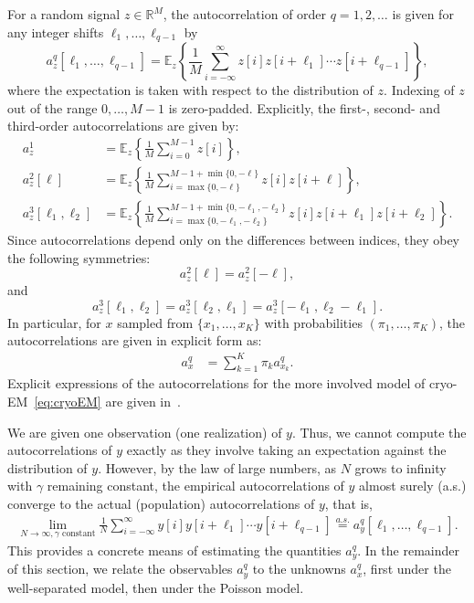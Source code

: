 \documentclass[12pt]{article}
\newcommand{\E}{\mathbb{E}}
\newcommand{\1}{\mathbf{1}}
\newcommand{\TODO}[1]{{\color{red}{[#1]}}}
\newcommand{\R}{\mathbb{R}}
\newcommand{\aseq}{\stackrel{a.s.}{=}}
\theoremstyle{plain}
\theoremstyle{definition}
\theoremstyle{remark}
\theoremstyle{plain}
\theoremstyle{remark}
\theoremstyle{plain}
\theoremstyle{plain}
\theoremstyle{plain}
\numberwithin{equation}{section}
\begin{document}
For a random signal $z\in \R^M$, the autocorrelation of order $q = 1, 2, \ldots$ is given for any integer shifts $\ell_1, \ldots, \ell_{q-1}$ by
\begin{equation}
a_z^q[\ell_1,\ldots,\ell_{q-1}]   = \E_z\left\{\frac{1}{M} \sum_{i=-\infty}^{\infty} z[i]z[i+\ell_1]\cdots z[i+\ell_{q-1}]\right\},
\label{eq:ac_general}
\end{equation}
where the expectation is taken with respect to the distribution of $z$. Indexing of $z$ out of the range $0, \ldots, M-1$ is zero-padded.
Explicitly, the first-, second- and third-order autocorrelations are given by: 
\begin{align}  
a_z^1 & = \E_z\left\{\frac{1}{M} \sum_{i=0}^{M-1} 
z[i]\right\}, \nonumber\\
a_z^2[\ell] & = \E_z\left\{\frac{1}{M} \sum_{i = \max\{0, -\ell\}}^{M-1 + \min\{0, -\ell\}} z[i]z[i+\ell]\right\}, \label{eq:ac_special} \\
a_z^3[\ell_1,\ell_2] & = \E_z\left\{\frac{1}{M} \sum_{i = \max\{0, -\ell_1, -\ell_2\}}^{M-1 + \min\{0, -\ell_1, -\ell_2\}} z[i]z[i+\ell_1]z[i+\ell_2]\right\}. \nonumber
\end{align}
Since  autocorrelations depend only on the differences between indices, they obey the following symmetries: $$a_z^2[\ell] = a_z^2[-\ell],$$ and
$$a_z^3[\ell_1,\ell_2] = a_z^3[\ell_2,\ell_1]=a_z^3[-\ell_1,\ell_2-\ell_1].
$$
In particular, for
$x$ sampled from $\{ x_1, \ldots, x_K \}$ with probabilities $(\pi_1, \ldots, \pi_K)$,  the autocorrelations are given in explicit form as:
\begin{align}
	a_x^q  & = \sum_{k=1}^{K} \pi_ka_{x_k}^q.
	\label{eq:mixedautocorr}
\end{align}
Explicit expressions of the autocorrelations for the more involved model of  cryo-EM~\eqref{eq:cryoEM} are given in~\cite{bendory2018toward}.

We are given one observation (one realization) of $y$. Thus, we cannot compute the autocorrelations of $y$ exactly as they involve taking an expectation against the distribution of $y$. However, by the law of large numbers, as $N$ grows to infinity with $\gamma$ remaining constant, the empirical autocorrelations of $y$ almost surely (a.s.) converge to the actual (population) autocorrelations of $y$, that is, %
\begin{align}
\lim_{N \to \infty, \gamma \textrm{ constant}} \frac{1}{N} \sum_{i=-\infty}^{\infty} y[i]y[i+\ell_1]\cdots y[i+\ell_{q-1}] \aseq a_y^q[\ell_1, \ldots, \ell_{q-1}].
\end{align}
\TODO{Why do we need constant $\gamma$?}
This provides a concrete means of estimating the quantities $a_y^ q$. In the remainder of this section, we relate the observables $a_y^q$  to the unknowns $a_x^q$, first under the well-separated model, then under the Poisson model.
\end{document}
